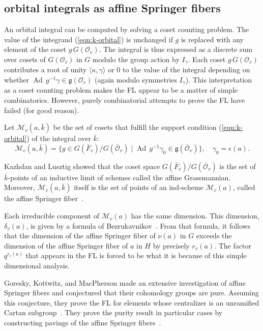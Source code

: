 \documentclass[brochure,english,12pt]{bourbaki}
\theoremstyle{plain}
\def\op#1{{\operatorname{#1}}}
\def\g{\mathfrak{g}}
\def\M{{\mathcal M}}
\def\O{{\mathcal O}}
\begin{document}
\subsection{orbital integrals as affine Springer fibers}\label{sec:coset}

An orbital integral can be computed by solving a coset counting
problem.  The value of the integrand (\ref{eqn:k-orbital}) is
unchanged if $g$ is replaced with any element of the coset
$g\,G(\O_v)$.  The integral is thus expressed as a discrete sum over
cosets of $G(\O_v)$ in $G$ modulo the group action by $I_\gamma$.
Each coset $g\, G(\O_v)$ contributes a root of unity
$\langle\kappa,\gamma\rangle$ or $0$ to the value of the integral
depending on whether $\op{Ad}\,g^{-1}\gamma \in \g(\O_v)$ (again
modulo symmetries $I_\gamma$).  This interpretation as a coset
counting problem makes the FL appear to be a matter of simple
combinatorics.  However, purely combinatorial attempts to prove the FL
have failed (for good reason).

Let $\M_v(a,\bar k)$ be the set of cosets that fulfill the support
condition (\ref{eqn:k-orbital}) of the integral over $\bar k$:
\[
\M_v(a,\bar k) = \{g\in G(\bar F_v)/G(\bar \O_v) 
\mid \op{Ad}\,g^{-1} \gamma_0 \in \g(\bar\O_v)\}, 
\quad \gamma_0 = \epsilon(a).
\]

Kazhdan and Lusztig showed that the coset space $G(\bar
F_v)/G(\bar\O_v)$ is the set of $\bar k$-points of an inductive limit
of schemes called the affine Grassmannian.  Moreover, $\M_v(a,\bar k)$ itself
is the set of points of an ind-scheme $\M_v(a)$, called the affine
Springer fiber~\cite{KL:1988}.

Each irreducible component of $\M_v(a)$ has the same dimension.  This
dimension, $\delta_v(a)$, is given by a formula of
Bezrukavnikov~\cite{Bezrukavnikov}.  From that formula, it follows
that the dimension of the affine Springer fiber of $\nu(a)$ in $G$
exceeds the dimension of the affine Springer fiber of $a$ in $H$ by
precisely $r_v(a)$.  The factor $q^{r_v(a)}$ that appears in the FL is
forced to be what it is because of this simple dimensional analysis.

Goresky, Kottwitz, and MacPherson made an extensive investigation of
affine Springer fibers and conjectured that their 
cohomology groups are pure.  Assuming this conjecture, they prove the
FL for elements whose centralizer is an unramified Cartan
subgroup~\cite{GKM:2004}.  They prove the purity result in particular
cases by constructing pavings of the affine Springer
fibers~\cite{GKM:2006}.  
\end{document}
